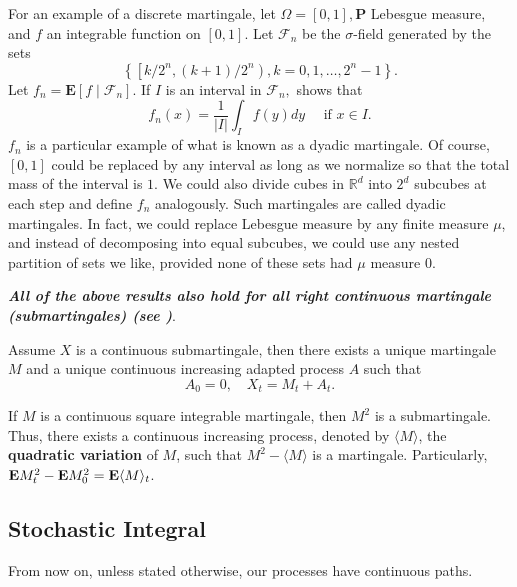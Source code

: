 \begin{example}
    For an example of a discrete martingale, let $\Omega=[0,1], \mathbf{P}$ Lebesgue measure, and $f$ an integrable function on $[0,1]$. Let $\mathcal{F}_n$ be the $\sigma$-field generated by the sets 
    \[
        \left\{\left[k / 2^n,(k+1) / 2^n\right), k=0,1, \ldots, 2^n-1\right\}. 
    \]
    Let $f_n=\mathbf{E}\left[f \mid \mathcal{F}_n\right]$. If $I$ is an interval in $\mathcal{F}_n,$ shows that
    $$
      f_n(x)=\frac{1}{|I|} \int_I f(y) d y \quad \text { if } x \in I.
    $$
    $f_n$ is a particular example of what is known as a dyadic martingale. Of course, $[0,1]$ could be replaced by any interval as long as we normalize so that the total mass of the interval is $1$. We could also divide cubes in $\mathbb{R}^d$ into $2^d$ subcubes at each step and define $f_n$ analogously. Such martingales are called dyadic martingales. In fact, we could replace Lebesgue measure by any finite measure $\mu$, and instead of decomposing into equal subcubes, we could use any nested partition of sets we like, provided none of these sets had $\mu$ measure $0$.
\end{example}
    
{\bf {\em All of the above results also hold for all right continuous martingale (submartingales) (see \cite{Huang})}}. 
	
	\begin{theorem}
	Assume $X$ is a continuous submartingale, then there exists a unique martingale $M$ and a unique continuous increasing adapted process $A$ such that 
	\[
	A_0=0, \quad X_t= M_t+A_t. 
	\]
	\end{theorem}
	If $M$ is a continuous square integrable martingale, then $M^2$ is a submartingale. Thus, there exists a continuous increasing process, denoted by $\langle M\rangle$, the {\bf quadratic variation} of $M$, such that $M^2-\langle M\rangle$ is a martingale. Particularly, ${\mathbf E} M_t^2 - {\mathbf E} M_0^2 = {\mathbf E} \langle M \rangle_t$. 
	 
	
\subsection{Stochastic Integral}
	
From now on, unless stated otherwise, our processes have continuous paths. 
	
